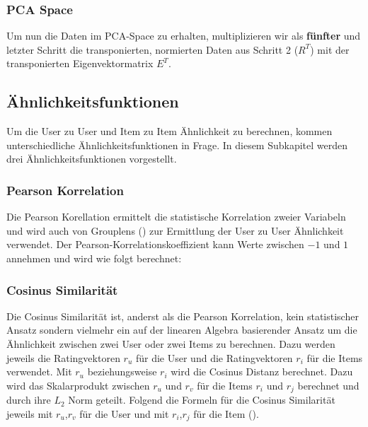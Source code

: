 \subsubsection{PCA Space}
Um nun die Daten im PCA-Space zu erhalten, multiplizieren wir als \textbf{fünfter} und letzter Schritt die transponierten, normierten Daten aus Schritt 2 ($R^T$) mit der transponierten Eigenvektormatrix $E^T$. 



\subsection{Ähnlichkeitsfunktionen}
Um die User zu User und Item zu Item Ähnlichkeit zu berechnen, kommen unterschiedliche Ähnlichkeitsfunktionen in Frage. In diesem Subkapitel werden drei Ähnlichkeitsfunktionen vorgestellt.

\subsubsection{Pearson Korrelation}
Die Pearson Korellation ermittelt die statistische Korrelation zweier Variabeln und wird auch von Grouplens (\cite{Resnick94grouplens:an}) zur Ermittlung der User zu User Ähnlichkeit verwendet. Der Pearson-Korrelationskoeffizient kann Werte zwischen $-1$ und $1$ annehmen und wird wie folgt berechnet:




\subsubsection{Cosinus Similarität}

Die Cosinus Similarität ist, anderst als die Pearson Korrelation, kein statistischer Ansatz sondern vielmehr ein auf der linearen Algebra basierender Ansatz um die Ähnlichkeit zwischen zwei User oder zwei Items zu berechnen. Dazu werden jeweils die Ratingvektoren $r_u$ für die User und die Ratingvektoren $r_i$ für die Items verwendet.
Mit $r_u$ beziehungsweise $r_i$ wird die Cosinus Distanz berechnet. Dazu wird das Skalarprodukt zwischen $r_u$ und $r_v$ für die Items $r_i$ und $r_j$ berechnet und durch ihre $L_2$ Norm geteilt.
Folgend die Formeln für die Cosinus Similarität jeweils mit $r_u$,$r_v$ für die User und mit $r_i$,$r_j$ für die Item (\cite{Ekstrand2011}).

